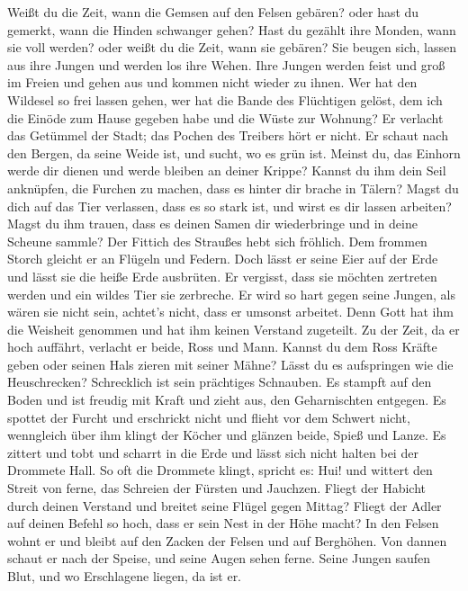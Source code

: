  Weißt du die Zeit, wann die Gemsen auf den Felsen
gebären? oder hast du gemerkt, wann die Hinden schwanger gehen?
 Hast du gezählt ihre Monden, wann sie voll werden? oder
weißt du die Zeit, wann sie gebären?  Sie beugen sich,
lassen aus ihre Jungen und werden los ihre Wehen.  Ihre
Jungen werden feist und groß im Freien und gehen aus und kommen nicht
wieder zu ihnen.  Wer hat den Wildesel so frei lassen
gehen, wer hat die Bande des Flüchtigen gelöst,  dem ich
die Einöde zum Hause gegeben habe und die Wüste zur Wohnung?
 Er verlacht das Getümmel der Stadt; das Pochen des
Treibers hört er nicht.  Er schaut nach den Bergen, da
seine Weide ist, und sucht, wo es grün ist.  Meinst du,
das Einhorn werde dir dienen und werde bleiben an deiner Krippe?
 Kannst du ihm dein Seil anknüpfen, die Furchen zu
machen, dass es hinter dir brache in Tälern?  Magst du
dich auf das Tier verlassen, dass es so stark ist, und wirst es dir
lassen arbeiten?  Magst du ihm trauen, dass es deinen
Samen dir wiederbringe und in deine Scheune sammle?  Der
Fittich des Straußes hebt sich fröhlich. Dem frommen Storch gleicht er
an Flügeln und Federn.  Doch lässt er seine Eier auf der
Erde und lässt sie die heiße Erde ausbrüten.  Er
vergisst, dass sie möchten zertreten werden und ein wildes Tier sie
zerbreche.  Er wird so hart gegen seine Jungen, als wären
sie nicht sein, achtet's nicht, dass er umsonst arbeitet.
 Denn Gott hat ihm die Weisheit genommen und hat ihm
keinen Verstand zugeteilt.  Zu der Zeit, da er hoch
auffährt, verlacht er beide, Ross und Mann.  Kannst du
dem Ross Kräfte geben oder seinen Hals zieren mit seiner Mähne?
 Lässt du es aufspringen wie die Heuschrecken?
Schrecklich ist sein prächtiges Schnauben.  Es stampft
auf den Boden und ist freudig mit Kraft und zieht aus, den Geharnischten
entgegen.  Es spottet der Furcht und erschrickt nicht und
flieht vor dem Schwert nicht,  wenngleich über ihm klingt
der Köcher und glänzen beide, Spieß und Lanze.  Es
zittert und tobt und scharrt in die Erde und lässt sich nicht halten bei
der Drommete Hall.  So oft die Drommete klingt, spricht
es: Hui! und wittert den Streit von ferne, das Schreien der Fürsten und
Jauchzen.  Fliegt der Habicht durch deinen Verstand und
breitet seine Flügel gegen Mittag?  Fliegt der Adler auf
deinen Befehl so hoch, dass er sein Nest in der Höhe macht?
 In den Felsen wohnt er und bleibt auf den Zacken der
Felsen und auf Berghöhen.  Von dannen schaut er nach der
Speise, und seine Augen sehen ferne.  Seine Jungen saufen
Blut, und wo Erschlagene liegen, da ist er.

